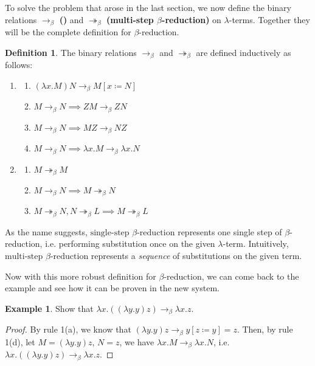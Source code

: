 \documentclass[a4paper,11pt]{article}
\theoremstyle{definition}
\newtheorem{definition}{Definition}[section]
\theoremstyle{example}
\newtheorem*{example}{Example}
\theoremstyle{lemma}
\newcommand{\lamterm}[2]{\lambda #1. #2}
\newcommand{\subs}[3]{#1[#2\coloneqq#3]}
\newcommand{\ssbr}{\rightarrow_{\beta}}
\newcommand{\msbr}{\twoheadrightarrow_{\beta}}
\newcommand{\tssbr}{\text{single-step $\beta$-reduction}}
\newcommand{\tmsbr}{\text{multi-step $\beta$-reduction}}
\begin{document}
To solve the problem that arose in the last section, we now define the binary relations $\ssbr$ \textbf{(\tssbr)} and $\msbr$ \textbf{(multi-step $\beta$-reduction)} on $\lambda$-terms. Together they will be the complete definition for $\beta$-reduction.
\begin{definition}
The binary relations $\ssbr$ and $\msbr$ are defined inductively as follows: 
\begin{enumerate}[topsep=2pt,itemsep=-0.5ex,partopsep=1ex,parsep=1ex]
    \item \begin{enumerate}[topsep=2pt,itemsep=-0.5ex,partopsep=1ex,parsep=1ex]
        \item $(\lamterm{x}{M})N \ssbr \subs{M}{x}{N}$
        \item $M \ssbr N \implies ZM \ssbr ZN$ $\quad$
        \item $M \ssbr N \implies MZ \ssbr NZ$
        \item $M \ssbr N \implies \lamterm{x}{M} \ssbr \lamterm{x}{N}$
    \end{enumerate}
    \item \begin{enumerate}[topsep=2pt,itemsep=-0.5ex,partopsep=1ex,parsep=1ex]
        \item $M \msbr M$
        \item $M \ssbr N \implies M \msbr N$
        \item $M \msbr N, N \msbr L \implies M \msbr L$
    \end{enumerate}
\end{enumerate}
\end{definition}
As the name suggests, $\tssbr$ represents one single step of $\beta$-reduction, i.e. performing substitution once on the given $\lambda$-term. Intuitively, $\tmsbr$ represents a \textit{sequence} of substitutions on the given term.

Now with this more robust definition for $\beta$-reduction, we can come back to the example and see how it can be proven in the new system.

\begin{example}
Show that $\lamterm{x}{((\lamterm{y}{y})z)} \ssbr \lamterm{x}{z}$.
\end{example}
\begin{proof}
By rule 1(a), we know that $(\lamterm{y}{y})z \ssbr \subs{y}{z}{y} = z$. Then, by rule 1(d), let $M = (\lamterm{y}{y})z$, $N = z$, we have $\lamterm{x}{M} \ssbr \lamterm{x}{N}$, i.e. $\lamterm{x}{((\lamterm{y}{y})z)} \ssbr \lamterm{x}{z}$.
\end{proof}
\end{document}
